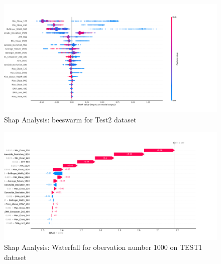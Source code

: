 \documentclass[11pt]{article}
\begin{document}
\begin{figure}[ht]
    \centering
    \includegraphics[width=1.2\textwidth]{AMZN/shap_analysis_beeswarm_test_2.png}
    \caption{Shap Analysis: beeswarm for Test2 dataset}
    \label{fig:shap_analysis_beeswarm_2}
\end{figure}

\begin{figure}[ht]
    \centering
    \includegraphics[width=1.2\textwidth]{AMZN/shap_analysis_waterfall_test_1_observation_1000.png}
    \caption{Shap Analysis: Waterfall for obervation number 1000 on TEST1 dataset}
    \label{fig:shap_analysis_waterfall_1}
\end{figure}

\newpage
\end{document}
